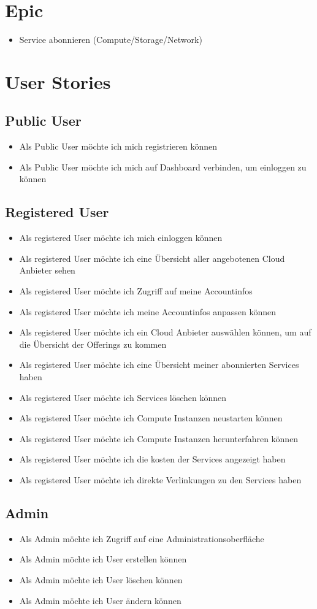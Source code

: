 \section{Epic}
\begin{itemize}
  \item Service abonnieren (Compute/Storage/Network)
\end{itemize}

\section{User Stories}

\subsection{Public User}
\begin{itemize}
  \item Als Public User möchte ich mich registrieren können
  \item Als Public User möchte ich mich auf Dashboard verbinden, um einloggen zu 
  können
\end{itemize}
\subsection{Registered User}
\begin{itemize}
  \item Als registered User möchte ich mich einloggen können
  \item Als registered User möchte ich eine Übersicht aller angebotenen Cloud 
  Anbieter sehen
  \item Als registered User möchte ich Zugriff auf meine Accountinfos
  \item Als registered User möchte ich meine Accountinfos anpassen können
  \item Als registered User möchte ich ein Cloud Anbieter auswählen können, um 
  auf die Übersicht der Offerings zu kommen
  \item Als registered User möchte ich eine Übersicht meiner abonnierten 
  Services haben
  \item Als registered User möchte ich Services löschen können
  \item Als registered User möchte ich Compute Instanzen neustarten können
  \item Als registered User möchte ich Compute Instanzen herunterfahren können
  \item Als registered User möchte ich die kosten der Services angezeigt haben
  \item Als registered User möchte ich direkte Verlinkungen zu den Services 
  haben
\end{itemize}

 
\subsection{Admin}
\begin{itemize}
  \item Als Admin möchte ich Zugriff auf eine Administrationsoberfläche
  \item Als Admin möchte ich User erstellen können
  \item Als Admin möchte ich User löschen können
  \item Als Admin möchte ich User ändern können
\end{itemize}

